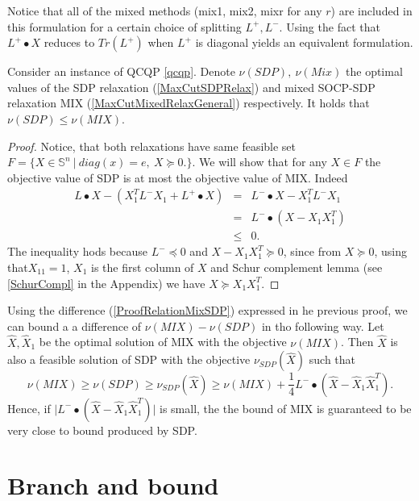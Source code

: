 \documentclass[12pt]{book}
\theoremstyle{definition}
\begin{document}
\rem Notice that all of the mixed methods (mix1, mix2, mixr for any $r$) are included in this formulation for a certain choice of splitting $L^+, L^-$. Using the fact that $L^+\bullet X$ reduces to $Tr(L^+)$ when $L^+$ is diagonal yields an equivalent formulation.



\thm Consider an instance of QCQP \ref{qcqp}. Denote $\nu(SDP), \ \nu(Mix)$ the optimal values of the SDP relaxation (\ref{MaxCutSDPRelax}) and mixed SOCP-SDP relaxation MIX (\ref{MaxCutMixedRelaxGeneral}) respectively. It holds that $\nu(SDP)\leq \nu(MIX)$.
\rm
\begin{proof}
Notice, that both relaxations have same feasible set $F = \{X\in \mathbb{S}^n \ \vert \ diag(x) = e,\ X\succeq 0.\}$. We will show that for any $X\in F$ the objective value of SDP is at most the objective value of MIX. Indeed
\begin{equation}
\label{ProofRelationMixSDP}
\begin{array}{rcl}
L\bullet X - ( X_1^TL^-X_1 + L^+\bullet X) 
& = & L^-\bullet X - X_1^TL^-X_1 \\ 
&=&  L^-\bullet (X - X_1 X_1^T) \\ 
&\leq & 0.
\end{array}
\end{equation}
The inequality hods because $L^-\preceq 0$ and $X-X_1X_1^T\succeq 0$,
since from $X\succeq 0$, using that$X_{11}=1$, $X_1$ is the first column of $X$ and Schur complement lemma (see \ref{SchurCompl} in the Appendix) we have $X\succeq X_1X_1^T.$ 
\end{proof}

\rem Using the difference (\ref{ProofRelationMixSDP}) expressed in he previous proof, we can bound a a difference of $\nu(MIX)-\nu(SDP)$ in tho following way. Let $\hat{X}, \hat{X}_1$ be the optimal solution of MIX with the objective $\nu(MIX)$. Then $\hat{X}$ is also a feasible solution of SDP with the objective $\nu_{SDP}(\hat{X})$ such that
$$\nu(MIX)\geq \nu(SDP) \geq \nu_{SDP}(\hat{X})\geq \nu(MIX) + \frac{1}{4}L^-\bullet (\hat{X} - \hat{X}_1 \hat{X}_1^T).$$
Hence, if $\vert L^-\bullet (\hat{X} - \hat{X}_1 \hat{X}_1^T)\vert$ is small, the the bound of MIX is guaranteed to be very close to bound produced by SDP. 






\section{Branch and bound}
\label{SectionBranchAndBound}
\end{document}
